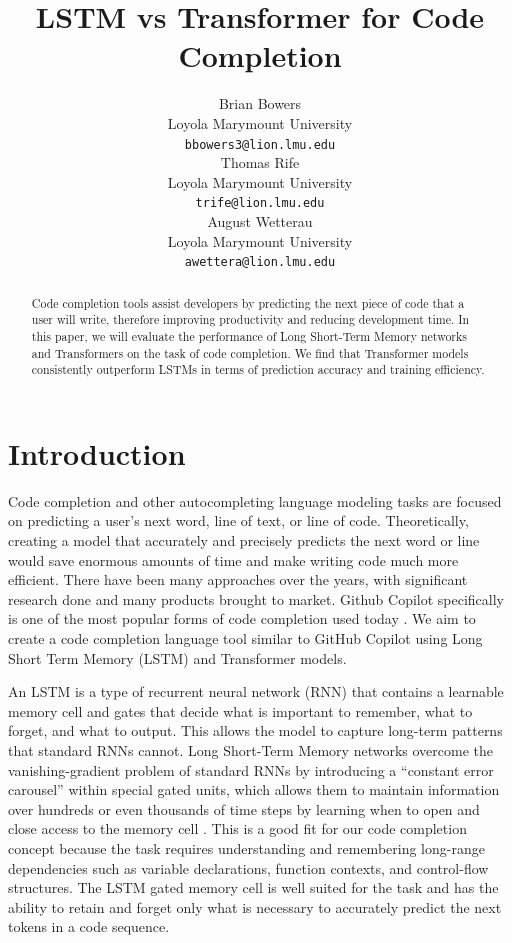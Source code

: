 \documentclass[11pt]{article}
\title{LSTM vs Transformer for Code Completion}
\author{Brian Bowers \\
 Loyola Marymount University \\
    \texttt{bbowers3@lion.lmu.edu} \\\And
 Thomas Rife \\
 Loyola Marymount University\\
    \texttt{trife@lion.lmu.edu} \\ \And
 August Wetterau \\
 Loyola Marymount University \\
    \texttt{awettera@lion.lmu.edu} \\}
\begin{document}
\maketitle



\begin{abstract}
Code completion tools assist developers by predicting the next piece of code that a user will write, therefore improving productivity and reducing development time. In this paper, we will evaluate the performance of Long Short-Term Memory networks and Transformers on the task of code completion. We find that Transformer models consistently outperform LSTMs in terms of prediction accuracy and training efficiency.

\end{abstract}




\section{Introduction}

Code completion and other autocompleting language modeling tasks are focused on predicting a user's next word, line of text, or line of code. Theoretically, creating a model that accurately and precisely predicts the next word or line would save enormous amounts of time and make writing code much more efficient. There have been many approaches over the years, with significant research done and many products brought to market. Github Copilot specifically is one of the most popular forms of code completion used today \cite{copilot}. We aim to create a code completion language tool similar to GitHub Copilot using Long Short Term Memory (LSTM) and Transformer models. 

An LSTM is a type of recurrent neural network (RNN) that contains a learnable memory cell and gates that decide what is important to remember, what to forget, and what to output. This allows the model to capture long-term patterns that standard RNNs cannot. Long Short-Term Memory networks overcome the vanishing-gradient problem of standard RNNs by introducing a “constant error carousel” within special gated units, which allows them to maintain information over hundreds or even thousands of time steps by learning when to open and close access to the memory cell \cite{paper1}. This is a good fit for our code completion concept because the task requires understanding and remembering long-range dependencies such as variable declarations, function contexts, and control-flow structures. The LSTM gated memory cell is well suited for the task and has the ability to retain and forget only what is necessary to accurately predict the next tokens in a code sequence.
\end{document}
